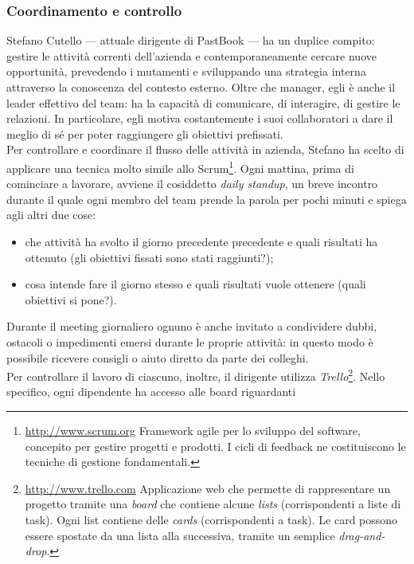 			\subsubsection{Coordinamento e controllo}
				Stefano Cutello — attuale dirigente di PastBook — ha un duplice compito: gestire le attività correnti dell'azienda e
				contemporaneamente cercare nuove opportunità, prevedendo i mutamenti e sviluppando una strategia interna attraverso
				la conoscenza del contesto esterno. Oltre che manager, egli è anche il leader effettivo del team: ha la capacità di
				comunicare, di interagire, di gestire le relazioni. In particolare, egli motiva costantemente i suoi collaboratori a
				dare il meglio di sé per poter raggiungere gli obiettivi prefissati.\\
				Per controllare e coordinare il flusso delle attività in azienda, Stefano ha scelto di applicare una tecnica molto
				simile allo Scrum\footnote{\url{http://www.scrum.org} Framework agile per lo sviluppo del software, concepito per gestire progetti e prodotti. I cicli di feedback
ne costituiscono le tecniche di gestione fondamentali.}. Ogni mattina, prima di cominciare a lavorare, avviene il
				cosiddetto \emph{daily standup}, un breve incontro durante il quale ogni membro del team prende la parola per pochi
				minuti e spiega agli altri due cose:
				\begin{itemize}
					\item che attività ha svolto il giorno precedente precedente e quali risultati ha ottenuto (gli obiettivi
					fissati sono stati raggiunti?);
					\item cosa intende fare il giorno stesso e quali risultati vuole ottenere (quali obiettivi si pone?).
				\end{itemize}
				Durante il meeting giornaliero ognuno è anche invitato a condividere dubbi, ostacoli o impedimenti emersi durante le
				proprie attività: in questo modo è possibile ricevere consigli o aiuto diretto da parte dei colleghi.\\
				Per controllare il lavoro di ciascuno, inoltre, il dirigente utilizza
				\emph{Trello}\footnote{\url{http://www.trello.com} Applicazione web che permette di rappresentare un progetto tramite una \emph{board} che contiene alcune
\emph{lists} (corrispondenti a liste di task). Ogni list contiene delle \emph{cards} (corrispondenti a task). Le card possono essere spostate da una
lista alla successiva, tramite un semplice \emph{drag-and-drop}.}. Nello specifico, ogni dipendente ha accesso alle board riguardanti
